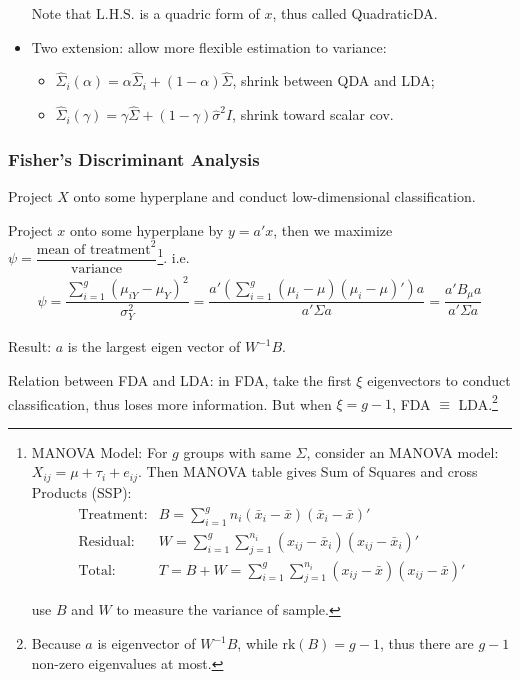 \begin{itemize}[topsep=2pt,itemsep=2pt]
        Note that $  \mathrm{L.H.S.} $ is a quadric form of $ x $, thus called QuadraticDA.
        \item Two extension: allow more flexible estimation to variance:
        \begin{itemize}[topsep=2pt,itemsep=2pt]
            \item $ \hat{\Sigma }_i(\alpha )=\alpha\hat{\Sigma }_i+(1-\alpha )\hat{\Sigma } $, shrink between QDA and LDA;
            \item $ \hat{\Sigma }_i(\gamma )=\gamma \hat{\Sigma }+(1-\gamma )\hat{\sigma }^2I $, shrink toward scalar cov.
        \end{itemize}
        
            
    \end{itemize}
    

\subsubsection{Fisher's Discriminant Analysis}
    Project $ X $ onto some hyperplane and conduct low-dimensional classification.

    Project $ x $ onto some hyperplane by $ y=a'x  $, then we maximize $ \psi =\dfrac{\text{mean of treatment}^2}{\text{variance}} $\footnote{MANOVA Model:    
    For $ g $ groups with same $ \Sigma  $, consider an MANOVA model: $ X_{ij}=\mu +\tau_i+e_{ij} $. Then MANOVA table gives Sum of Squares and cross Products (SSP):
    \begin{align*}
        \text{Treatment:}&B=\sum_{i=1}^gn_i(\bar{x}_i-\bar{x})(\bar{x}_i-\bar{x})'\\
        \text{Residual:}&W=\sum_{i=1}^g\sum_{j=1}^{n_i}(x_{ij}-\bar{x}_i)(x_{ij}-\bar{x}_i)'\\
        \text{Total:}&T=B+W=\sum_{i=1}^g\sum_{j=1}^{n_i}(x_{ij}-\bar{x})(x_{ij}-\bar{x})'
    \end{align*}

    use $ B $ and $ W $ to measure the variance of sample.
    }. i.e.
    \begin{align*}
        \psi =\dfrac{\sum\limits_{i=1}^g(\mu_{iY}-\mu_Y)^2}{\sigma ^2_Y}=\dfrac{a'\left(\sum\limits_{i=1}^g(\mu_i-\mu)(\mu_i-\mu)'\right)a}{a'\Sigma a}=\dfrac{a'B_\mu a}{a'\Sigma a}
    \end{align*}
    
    Result: $ a $ is the largest eigen vector of $ W^{-1}B $.

    Relation between FDA and LDA: in FDA, take the first $ \xi  $ eigenvectors to conduct classification, thus loses more information. But when $ \xi =g-1 $, FDA $ \equiv $ LDA.\footnote{Because $ a $ is eigenvector of $ W^{-1}B $, while $ \mathrm{rk}(B)=g-1 $, thus there are $ g-1 $ non-zero eigenvalues at most.}
   
